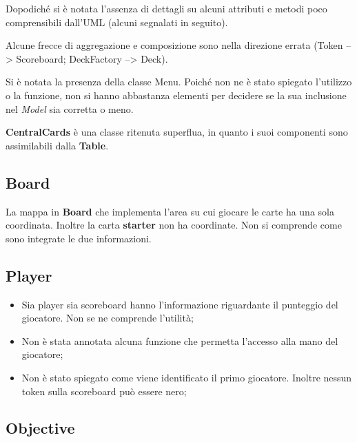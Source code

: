 \documentclass[12pt]{article}
\begin{document}
Dopodiché si è notata l'assenza di dettagli su alcuni attributi e metodi poco comprensibili dall'UML (alcuni segnalati in seguito).

Alcune frecce di aggregazione e composizione sono nella direzione errata (Token --> Scoreboard; DeckFactory --> Deck).

Si è notata la presenza della classe Menu. Poiché non ne è stato spiegato l'utilizzo o la funzione, non si hanno abbastanza elementi per decidere se la sua inclusione nel \textit{Model} sia corretta o meno.

\textbf{CentralCards} è una classe ritenuta superflua, in quanto i suoi componenti sono assimilabili dalla \textbf{Table}.

\subsection{Board}

La mappa in \textbf{Board} che implementa l'area su cui giocare le carte ha una sola coordinata. Inoltre la carta \textbf{starter} non ha coordinate. Non si comprende come sono integrate le due informazioni.

\subsection{Player}

\begin{itemize}
    \item Sia player sia scoreboard hanno l'informazione riguardante il punteggio del giocatore. Non se ne comprende l'utilità;
    \item Non è stata annotata alcuna funzione che permetta l'accesso alla mano del giocatore;
    \item Non è stato spiegato come viene identificato il primo giocatore. Inoltre nessun token sulla scoreboard può essere nero;
\end{itemize}

\subsection{Objective}
\end{document}
